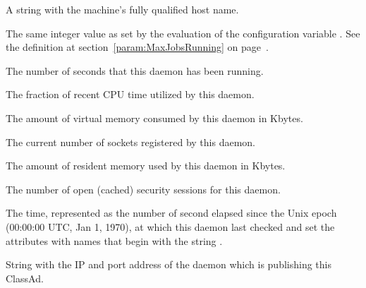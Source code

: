 \begin{description}
\item[\AdAttr{Machine}:] A string with the machine's fully qualified 
  host name.

\item[\AdAttr{MaxJobsRunning}:] The same integer value as set by the
  evaluation of the configuration variable .
  See the definition at section~\ref{param:MaxJobsRunning} on
  page~\pageref{param:MaxJobsRunning}.

\item[\AdAttr{MonitorSelfAge}:] The number of seconds that this daemon
  has been running.

\item[\AdAttr{MonitorSelfCPUUsage}:] The fraction of recent CPU time utilized
  by this daemon. 

\item[\AdAttr{MonitorSelfImageSize}:] The amount of virtual memory consumed by
  this daemon in Kbytes.

\item[\AdAttr{MonitorSelfRegisteredSocketCount}:] The current number of sockets
  registered by this daemon.

\item[\AdAttr{MonitorSelfResidentSetSize}:] The amount of resident memory
  used by this daemon in Kbytes.

\item[\AdAttr{MonitorSelfSecuritySessions}:] The number of open (cached)
  security sessions for this daemon.

\item[\AdAttr{MonitorSelfTime}:] The  time, represented as the number of
  second elapsed since the Unix epoch (00:00:00 UTC, Jan 1, 1970),
  at which this daemon last checked and set the attributes with names that
  begin with the string .
  
\item[\AdAttr{MyAddress}:] String with the IP and port address of the
 daemon which is publishing this ClassAd.


\end{description}

